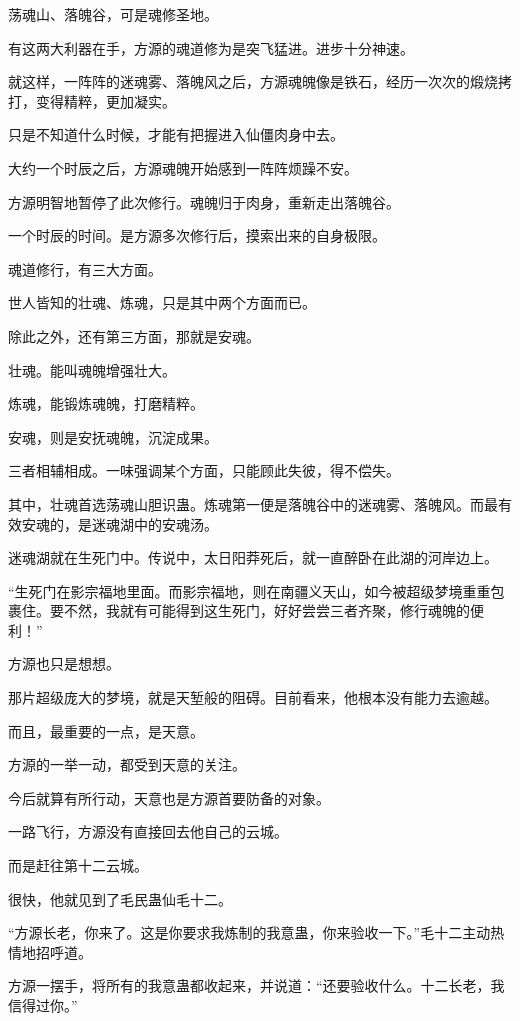 \begin{this_body}
荡魂山、落魄谷，可是魂修圣地。

有这两大利器在手，方源的魂道修为是突飞猛进。进步十分神速。

就这样，一阵阵的迷魂雾、落魄风之后，方源魂魄像是铁石，经历一次次的煅烧拷打，变得精粹，更加凝实。

只是不知道什么时候，才能有把握进入仙僵肉身中去。

大约一个时辰之后，方源魂魄开始感到一阵阵烦躁不安。

方源明智地暂停了此次修行。魂魄归于肉身，重新走出落魄谷。

一个时辰的时间。是方源多次修行后，摸索出来的自身极限。

魂道修行，有三大方面。

世人皆知的壮魂、炼魂，只是其中两个方面而已。

除此之外，还有第三方面，那就是安魂。

壮魂。能叫魂魄增强壮大。

炼魂，能锻炼魂魄，打磨精粹。

安魂，则是安抚魂魄，沉淀成果。

三者相辅相成。一味强调某个方面，只能顾此失彼，得不偿失。

其中，壮魂首选荡魂山胆识蛊。炼魂第一便是落魄谷中的迷魂雾、落魄风。而最有效安魂的，是迷魂湖中的安魂汤。

迷魂湖就在生死门中。传说中，太日阳莽死后，就一直醉卧在此湖的河岸边上。

“生死门在影宗福地里面。而影宗福地，则在南疆义天山，如今被超级梦境重重包裹住。要不然，我就有可能得到这生死门，好好尝尝三者齐聚，修行魂魄的便利！”

方源也只是想想。

那片超级庞大的梦境，就是天堑般的阻碍。目前看来，他根本没有能力去逾越。

而且，最重要的一点，是天意。

方源的一举一动，都受到天意的关注。

今后就算有所行动，天意也是方源首要防备的对象。

一路飞行，方源没有直接回去他自己的云城。

而是赶往第十二云城。

很快，他就见到了毛民蛊仙毛十二。

“方源长老，你来了。这是你要求我炼制的我意蛊，你来验收一下。”毛十二主动热情地招呼道。

方源一摆手，将所有的我意蛊都收起来，并说道：“还要验收什么。十二长老，我信得过你。”


\end{this_body}
